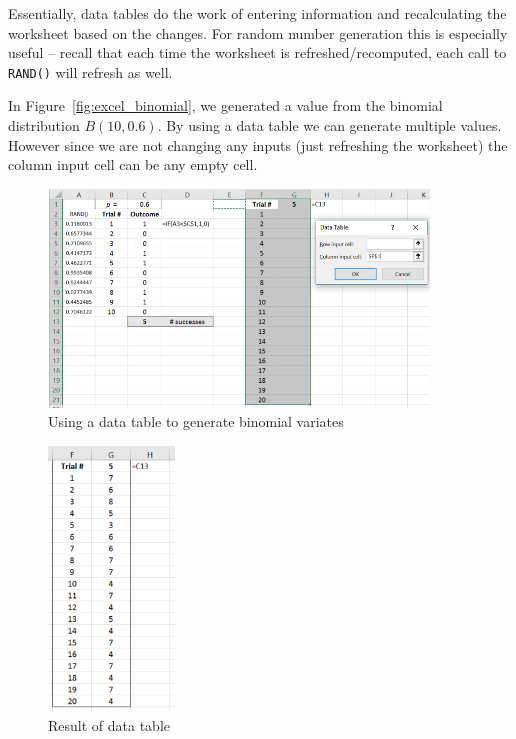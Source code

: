 Essentially, data tables do the work of entering information and recalculating the worksheet based on the changes.
For random number generation this is especially useful -- recall that each time the worksheet is refreshed/recomputed, each call to \texttt{RAND()} will refresh as well.

In Figure~\ref{fig:excel_binomial}, we generated a value from the binomial distribution $B(10,0.6)$.
By using a data table we can generate multiple values.
However since we are not changing any inputs (just refreshing the worksheet) the column input cell can be any empty cell.

\vspace{1cm}

\begin{figure}[htbp]
	\centering
	\includegraphics[width=0.9\textwidth]{fig/2_data_table_binomialA.png}
	\caption{Using a data table to generate binomial variates \label{fig:2_data_table_binomialA}}
\end{figure}

\begin{figure}[htbp]
	\centering
	\includegraphics[width=0.3\textwidth]{fig/2_data_table_binomialB.png}
	\caption{Result of data table \label{fig:2_data_table_binomialB}}
\end{figure}

